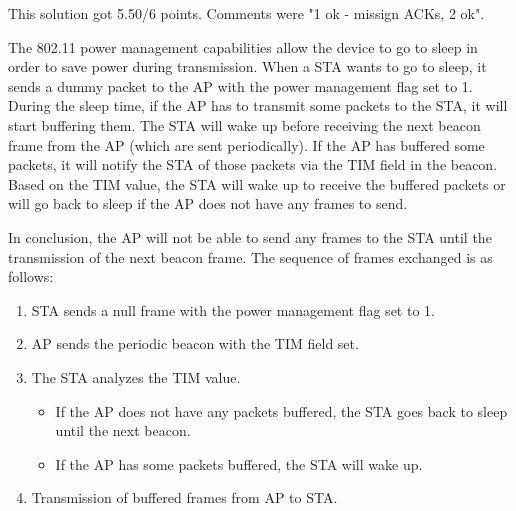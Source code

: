 \begin{solution}
    This solution got 5.50/6 points. Comments were "1 ok - missign ACKs, 2 ok".

    The 802.11 power management capabilities allow the device to go to sleep in order to save power during transmission. When a STA wants to go to sleep, it sends a dummy packet to the AP with the power management flag set to 1. During the sleep time, if the AP has to transmit some packets to the STA, it will start buffering them. The STA will wake up before receiving the next beacon frame from the AP (which are sent periodically). If the AP has buffered some packets, it will notify the STA of those packets via the TIM field in the beacon. Based on the TIM value, the STA will wake up to receive the buffered packets or will go back to sleep if the AP does not have any frames to send.

    In conclusion, the AP will not be able to send any frames to the STA until the transmission of the next beacon frame. The sequence of frames exchanged is as follows:
    \begin{enumerate}
        \item STA sends a null frame with the power management flag set to 1.
        \item AP sends the periodic beacon with the TIM field set.
        \item The STA analyzes the TIM value.
              \begin{itemize}
                  \item If the AP does not have any packets buffered, the STA goes back to sleep until the next beacon.
                  \item If the AP has some packets buffered, the STA will wake up.
              \end{itemize}
        \item Transmission of buffered frames from AP to STA.
    \end{enumerate}


\end{solution}
